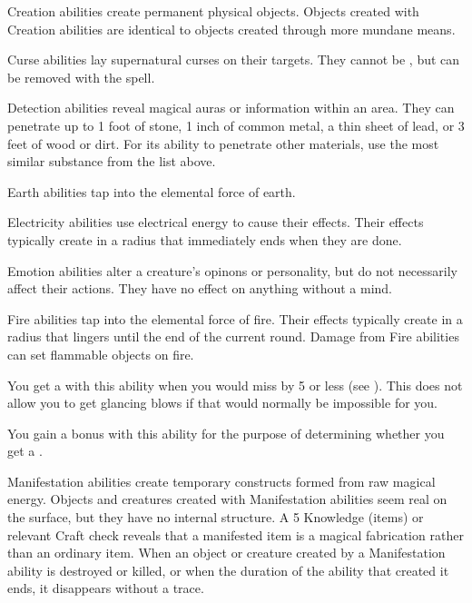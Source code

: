    Creation abilities create permanent physical objects.
  Objects created with Creation abilities are identical to objects created through more mundane means.

   Curse abilities lay supernatural curses on their targets.
  They cannot be , but can be removed with the  spell.

  \label{Detection} Detection abilities reveal magical auras or information within an area.
  They can penetrate up to 1 foot of stone, 1 inch of common metal, a thin sheet of lead, or 3 feet of wood or dirt.
  For its ability to penetrate other materials, use the most similar substance from the list above.

   Earth abilities tap into the elemental force of earth.

   Electricity abilities use electrical energy to cause their effects.
  Their effects typically create  in a \smallarea radius that immediately ends when they are done.

   Emotion abilities alter a creature's opinons or personality, but do not necessarily affect their actions.
  They have no effect on anything without a mind.

   Fire abilities tap into the elemental force of fire.
  Their effects typically create  in a \smallarea radius that lingers until the end of the current round.
  Damage from Fire abilities can set flammable objects on fire.

   You get a  with this ability when you would miss by 5 or less (see ).
  This does not allow you to get glancing blows if that would normally be impossible for you.

   You gain a   bonus with this ability for the purpose of determining whether you get a .

   Manifestation abilities create temporary constructs formed from raw magical energy.
  Objects and creatures created with Manifestation abilities seem real on the surface, but they have no internal structure.
  A  5 Knowledge (items) or relevant Craft check reveals that a manifested item is a magical fabrication rather than an ordinary item.
  When an object or creature created by a Manifestation ability is destroyed or killed, or when the duration of the ability that created it ends, it disappears without a trace.

